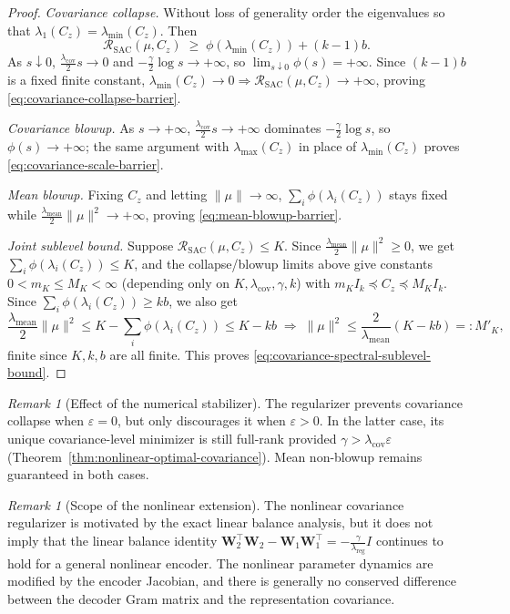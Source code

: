 \documentclass{article} %
\newcommand{\wa}{\mathbf{W}_1}
\newcommand{\wb}{\mathbf{W}_2}
\theoremstyle{remark}
\newtheorem{remark}[theorem]{Remark}
\begin{document}
{\begin{proof}
\emph{Covariance collapse.} Without loss of generality order the eigenvalues so that
$\lambda_1(C_z)=\lambda_{\min}(C_z)$. Then
\[
\mathcal{R}_{\mathrm{SAC}}(\mu,C_z)
\;\geq\;
\phi\left(\lambda_{\min}(C_z)\right)
+
(k-1)b.
\]
As $s\downarrow0$, $\frac{\lambda_{\mathrm{cov}}}{2}s\to0$ and $-\frac{\gamma}{2}\log s\to+\infty$,
so $\lim_{s\downarrow0}\phi(s)=+\infty$. Since $(k-1)b$ is a fixed finite constant,
$\lambda_{\min}(C_z)\to0\Rightarrow\mathcal{R}_{\mathrm{SAC}}(\mu,C_z)\to+\infty$, proving
\eqref{eq:covariance-collapse-barrier}.

\emph{Covariance blowup.} As $s\to+\infty$, $\frac{\lambda_{\mathrm{cov}}}{2}s\to+\infty$ dominates
$-\frac{\gamma}{2}\log s$, so $\phi(s)\to+\infty$; the same argument with $\lambda_{\max}(C_z)$ in
place of $\lambda_{\min}(C_z)$ proves \eqref{eq:covariance-scale-barrier}.

\emph{Mean blowup.} Fixing $C_z$ and letting $\|\mu\|\to\infty$, $\sum_i\phi(\lambda_i(C_z))$ stays
fixed while $\frac{\lambda_{\mathrm{mean}}}{2}\|\mu\|^2\to+\infty$, proving
\eqref{eq:mean-blowup-barrier}.

\emph{Joint sublevel bound.} Suppose $\mathcal{R}_{\mathrm{SAC}}(\mu,C_z)\leq K$. Since
$\frac{\lambda_{\mathrm{mean}}}{2}\|\mu\|^2\geq0$, we get $\sum_i\phi(\lambda_i(C_z))\leq K$, and
the collapse/blowup limits above give constants $0<m_K\leq M_K<\infty$ (depending only on
$K,\lambda_{\mathrm{cov}},\gamma,k$) with $m_KI_k\preceq C_z\preceq M_KI_k$. Since
$\sum_i\phi(\lambda_i(C_z))\geq kb$, we also get
\[
\frac{\lambda_{\mathrm{mean}}}{2}\|\mu\|^2
\leq
K-\sum_i\phi(\lambda_i(C_z))
\leq
K-kb
\;\Longrightarrow\;
\|\mu\|^2\leq\frac{2}{\lambda_{\mathrm{mean}}}(K-kb)=:M'_K,
\]
finite since $K,k,b$ are all finite. This proves \eqref{eq:covariance-spectral-sublevel-bound}.
\end{proof}}



\begin{remark}[Effect of the numerical stabilizer]
The regularizer prevents covariance collapse when \(\varepsilon=0\), but only discourages it when \(\varepsilon>0\). In the latter case, its unique covariance-level minimizer is still full-rank provided \(\gamma>\lambda_{\mathrm{cov}}\varepsilon\) (Theorem~\ref{thm:nonlinear-optimal-covariance}). Mean non-blowup remains guaranteed in both cases.
\end{remark}


\begin{remark}[Scope of the nonlinear extension]
The nonlinear covariance regularizer is motivated by the exact linear balance analysis, but it
does not imply that the linear balance identity $\wb^\top\wb-\wa\wa^\top
=-\frac{\gamma}{\lambda_{\mathrm{reg}}}I$ continues to hold for a general nonlinear encoder. The
nonlinear parameter dynamics are modified by the encoder Jacobian, and there is generally no
conserved difference between the decoder Gram matrix and the representation covariance. 
\end{remark}
\end{document}
